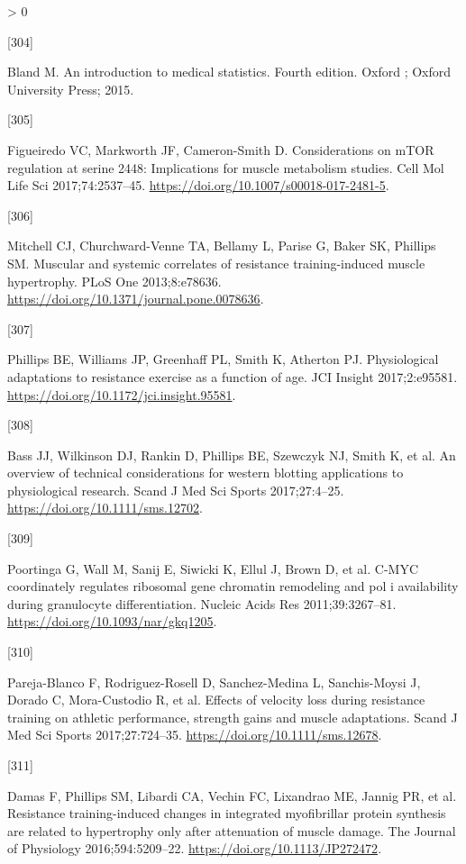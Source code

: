 \documentclass[twoside,10pt]{gihclass} %
\newlength{\cslhangindent}
\newlength{\csllabelwidth}
\newenvironment{CSLReferences}[3] %
 {%
  \setlength{\parindent}{0pt}
  \ifodd #1 \everypar{\setlength{\hangindent}{\cslhangindent}}\ignorespaces\fi
  \ifnum #2 > 0
  \setlength{\parskip}{#2\baselineskip}
  \fi
 }%
 {}
\newcommand{\CSLLeftMargin}[1]{\parbox[t]{\maxof{\widthof{#1}}{\csllabelwidth}}{#1}}
\newcommand{\CSLRightInline}[1]{\parbox[t]{\linewidth}{#1}}
\begin{document}
\begin{CSLReferences}{0}{0}
\leavevmode\hypertarget{ref-RN2007}{}%
\CSLLeftMargin{{[}304{]} }
\CSLRightInline{Bland M. An introduction to medical statistics. Fourth edition. Oxford ; Oxford University Press; 2015.}

\leavevmode\hypertarget{ref-RN2309}{}%
\CSLLeftMargin{{[}305{]} }
\CSLRightInline{Figueiredo VC, Markworth JF, Cameron-Smith D. Considerations on mTOR regulation at serine 2448: Implications for muscle metabolism studies. Cell Mol Life Sci 2017;74:2537--45. \url{https://doi.org/10.1007/s00018-017-2481-5}.}

\leavevmode\hypertarget{ref-RN788}{}%
\CSLLeftMargin{{[}306{]} }
\CSLRightInline{Mitchell CJ, Churchward-Venne TA, Bellamy L, Parise G, Baker SK, Phillips SM. Muscular and systemic correlates of resistance training-induced muscle hypertrophy. PLoS One 2013;8:e78636. \url{https://doi.org/10.1371/journal.pone.0078636}.}

\leavevmode\hypertarget{ref-RN2171}{}%
\CSLLeftMargin{{[}307{]} }
\CSLRightInline{Phillips BE, Williams JP, Greenhaff PL, Smith K, Atherton PJ. Physiological adaptations to resistance exercise as a function of age. JCI Insight 2017;2:e95581. \url{https://doi.org/10.1172/jci.insight.95581}.}

\leavevmode\hypertarget{ref-RN1942}{}%
\CSLLeftMargin{{[}308{]} }
\CSLRightInline{Bass JJ, Wilkinson DJ, Rankin D, Phillips BE, Szewczyk NJ, Smith K, et al. An overview of technical considerations for western blotting applications to physiological research. Scand J Med Sci Sports 2017;27:4--25. \url{https://doi.org/10.1111/sms.12702}.}

\leavevmode\hypertarget{ref-RN1832}{}%
\CSLLeftMargin{{[}309{]} }
\CSLRightInline{Poortinga G, Wall M, Sanij E, Siwicki K, Ellul J, Brown D, et al. C-MYC coordinately regulates ribosomal gene chromatin remodeling and pol i availability during granulocyte differentiation. Nucleic Acids Res 2011;39:3267--81. \url{https://doi.org/10.1093/nar/gkq1205}.}

\leavevmode\hypertarget{ref-RN2217}{}%
\CSLLeftMargin{{[}310{]} }
\CSLRightInline{Pareja-Blanco F, Rodriguez-Rosell D, Sanchez-Medina L, Sanchis-Moysi J, Dorado C, Mora-Custodio R, et al. Effects of velocity loss during resistance training on athletic performance, strength gains and muscle adaptations. Scand J Med Sci Sports 2017;27:724--35. \url{https://doi.org/10.1111/sms.12678}.}

\leavevmode\hypertarget{ref-RN2144}{}%
\CSLLeftMargin{{[}311{]} }
\CSLRightInline{Damas F, Phillips SM, Libardi CA, Vechin FC, Lixandrao ME, Jannig PR, et al. Resistance training-induced changes in integrated myofibrillar protein synthesis are related to hypertrophy only after attenuation of muscle damage. The Journal of Physiology 2016;594:5209--22. \url{https://doi.org/10.1113/JP272472}.}


\end{CSLReferences}
\end{document}
